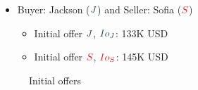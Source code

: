 \documentclass[
  ignorenonframetext,
]{beamer}
\providecommand{\tightlist}{%
  \setlength{\itemsep}{0pt}\setlength{\parskip}{0pt}}\usepackage{longtable,booktabs,array}
\begin{document}
\begin{frame}{}
\label{section-3}

\begin{itemize}
\item
  Buyer: Jackson (\(\color{blue}{J}\)) and Seller: Sofia
  (\(\color{red}{S}\))

  \begin{itemize}
  \tightlist
  \item
    Initial offer \(\color{blue}{J}\), \(\color{blue}{Io_J}\): 133K USD
  \item
    Initial offer \(\color{red}{S}\), \(\color{red}{Io_S}\): 145K USD
  \end{itemize}
\end{itemize}

\begin{figure}


\caption{\label{fig-initial-offer}Initial offers}

\end{figure}%
\end{frame}
\end{document}
